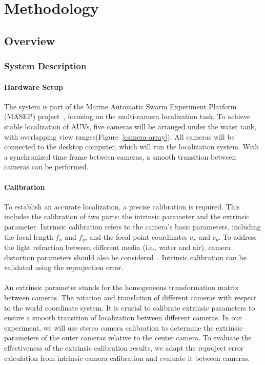 \documentclass[11pt]{article}
\begin{document}
\section{Methodology}
    \subsection{Overview }
        \subsubsection{System Description }
        \paragraph{Hardware Setup}
            The system is part of the Marine Automatic Swarm Experiment Platform (MASEP) project~\cite{cai_development_2024}, focusing on the multi-camera localization task. To achieve stable localization of AUVs, five cameras will be arranged under the water tank, with overlapping view ranges(Figure~\ref{camera-array}). All cameras will be connected to the desktop computer, which will run the localization system. With a synchronized time frame between cameras, a smooth transition between cameras can be performed. %
        \paragraph{Calibration}
            To establish an accurate localization, a precise calibration is required. This includes the calibration of two parts: the intrinsic parameter and the extrinsic parameter. Intrinsic calibration refers to the camera's basic parameters, including the focal length $f_x$ and $f_y$, and the focal point coordinates $c_x$ and $c_y$. To address the light refraction between different media (i.e., water and air), camera distortion parameters should also be considered~\cite{pedersen_camera_2018}. Intrinsic calibration can be validated using the reprojection error. \\
            \\
            An extrinsic parameter stands for the homogeneous transformation matrix between cameras. The rotation and translation of different cameras with respect to the world coordinate system. It is crucial to calibrate extrinsic parameters to ensure a smooth transition of localization between different cameras. In our experiment, we will use stereo camera calibration to determine the extrinsic parameters of the outer cameras relative to the center camera. To evaluate the effectiveness of the extrinsic calibration results, we adapt the reproject error calculation from intrinsic camera calibration and evaluate it between cameras.
\end{document}
